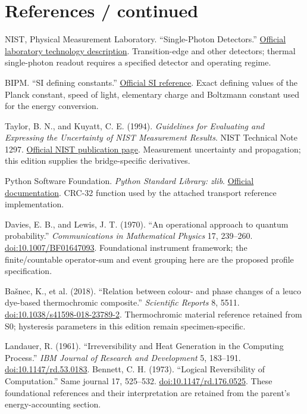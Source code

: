 \documentclass[10pt,a4paper]{article}
\numberwithin{equation}{section}
\newcommand{\newpart}{\clearpage}
\begin{document}
\newpart
\section*{References / continued}
\begin{description}[leftmargin=12mm,labelwidth=10mm,labelsep=2mm,itemsep=9pt]
\item[{[R9]}] NIST, Physical Measurement Laboratory. ``Single-Photon Detectors.'' \href{https://www.nist.gov/pml/productsservices/quantum-networks-nist/technologies-quantum-networks/single-photon-detectors}{Official laboratory technology description}. Transition-edge and other detectors; thermal single-photon readout requires a specified detector and operating regime.
\item[{[R10]}] BIPM. ``SI defining constants.'' \href{https://www.bipm.org/en/measurement-units/si-defining-constants}{Official SI reference}. Exact defining values of the Planck constant, speed of light, elementary charge and Boltzmann constant used for the energy conversion.
\item[{[R11]}] Taylor, B. N., and Kuyatt, C. E. (1994). \emph{Guidelines for Evaluating and Expressing the Uncertainty of NIST Measurement Results}. NIST Technical Note 1297. \href{https://www.nist.gov/pml/nist-technical-note-1297}{Official NIST publication page}. Measurement uncertainty and propagation; this edition supplies the bridge-specific derivatives.
\item[{[R12]}] Python Software Foundation. \emph{Python Standard Library: zlib}. \href{https://docs.python.org/3/library/zlib.html}{Official documentation}. CRC-32 function used by the attached transport reference implementation.
\item[{[R13]}] Davies, E. B., and Lewis, J. T. (1970). ``An operational approach to quantum probability.'' \emph{Communications in Mathematical Physics} 17, 239--260. \href{https://doi.org/10.1007/BF01647093}{doi:10.1007/BF01647093}. Foundational instrument framework; the finite/countable operator-sum and event grouping here are the proposed profile specification.
\item[{[R14]}] Ba\v snec, K., et al. (2018). ``Relation between colour- and phase changes of a leuco dye-based thermochromic composite.'' \emph{Scientific Reports} 8, 5511. \href{https://doi.org/10.1038/s41598-018-23789-2}{doi:10.1038/s41598-018-23789-2}. Thermochromic material reference retained from S0; hysteresis parameters in this edition remain specimen-specific.
\item[{[R15]}] Landauer, R. (1961). ``Irreversibility and Heat Generation in the Computing Process.'' \emph{IBM Journal of Research and Development} 5, 183--191. \href{https://doi.org/10.1147/rd.53.0183}{doi:10.1147/rd.53.0183}. Bennett, C. H. (1973). ``Logical Reversibility of Computation.'' Same journal 17, 525--532. \href{https://doi.org/10.1147/rd.176.0525}{doi:10.1147/rd.176.0525}. These foundational references and their interpretation are retained from the parent's energy-accounting section.
\end{description}
\end{document}
